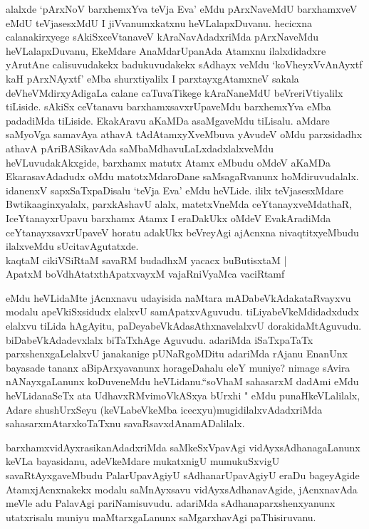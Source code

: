 \begin{artha}
alalxde `pArxNoV barxhemxYva teVja Eva' eMdu pArxNaveMdU barxhamxveV eMdU teVjasesxMdU I jiVvanumxkatxnu heVLalapxDuvanu. hecicxna calanakirxyege sAkiSxceVtanaveV kAraNavAdadxriMda pArxNaveMdu heVLalapxDuvanu, EkeMdare AnaMdarUpanAda Atamxnu ilalxdidadxre yArutAne calisuvudakekx badukuvudakekx sAdhayx veMdu `koVheyxVvAnAyxtf kaH pArxNAyxtf' eMba shurxtiyalilx I parxtayxgAtamxneV sakala deVheVMdirxyAdigaLa calane caTuvaTikege kAraNaneMdU beVreriVtiyalilx tiLiside. sAkiSx ceVtanavu barxhamxsavxrUpaveMdu barxhemxYva eMba padadiMda tiLiside. EkakAravu aKaMDa asaMgaveMdu tiLisalu. aMdare saMyoVga samavAya athavA tAdAtamxyXveMbuva yAvudeV oMdu parxsidadhx athavA pAriBASikavAda saMbaMdhavuLaLxdadxlalxveMdu heVLuvudakAkxgide, barxhamx matutx Atamx eMbudu oMdeV aKaMDa EkarasavAdadudx oMdu matotxMdaroDane saMsagaRvanunx hoMdiruvudalalx. idanenxV sapxSaTxpaDisalu `teVja Eva' eMdu heVLide. ililx teVjasesxMdare Bwtikaaginxyalalx, parxkAshavU alalx, matetxVneMda ceYtanayxveMdathaR, IceYtanayxrUpavu barxhamx Atamx I eraDakUkx oMdeV EvakAradiMda ceYtanayxsavxrUpaveV horatu adakUkx beVreyAgi ajAcnxna nivaqtitxyeMbudu ilalxveMdu sUcitavAgutatxde.\\
kaqtaM cikiVSiRtaM savaRM budadhxM yacacx buButisxtaM |\\
ApatxM boVdhAtatxthA\s \s patxvayxM vajaRniVyaMca vaciRtamf 
\end{artha}

\begin{artha}
eMdu heVLidaMte jAcnxnavu udayisida naMtara mADabeVkAdakataRvayxvu modalu apeVkiSxsidudx elalxvU samApatxvAguvudu. tiLiyabeVkeMdidadxdudx elalxvu tiLida hAgAyitu, paDeyabeVkAdasAthxnavelalxvU dorakidaMtAguvudu. biDabeVkAdadevxlalx biTaTxhAge Aguvudu. adariMda iSaTxpaTaTx parxshenxgaLelalxvU janakanige pUNaRgoMDitu adariMda rAjanu EnanUnx bayasade tananx aBipArxyavanunx horageDahalu eleY muniye? nimage sAvira nANayxgaLanunx koDuveneMdu heVLidanu.``soV\s haM sahasarxM dadAmi eMdu heVLidanaSeTx ata UdhavxRMvimoVkASxya bUrxhi " eMdu punaHkeVLalilalx, Adare shushUrxSeyu (keVLabeVkeMba icecxyu)mugidilalxvAdadxriMda sahasarxmAtarxkoTaTxnu savaRsavxdAnamADalilalx.
\end{artha}

\begin{artha}
barxhamxvidAyxrasikanAdadxriMda saMkeSxVpavAgi vidAyxsAdhanagaLanunx keVLa bayasidanu, adeVkeMdare mukatxnigU mumukuSxvigU savaRtAyxgaveMbudu PalarUpavAgiyU sAdhanarUpavAgiyU eraDu bageyAgide AtamxjAcnxnakekx modalu saMnAyxsavu vidAyxsAdhanavAgide, jAcnxnavAda meVle adu PalavAgi pariNamisuvudu. adariMda sAdhanaparxshenxyanunx utatxrisalu muniyu maMtarxgaLanunx saMgarxhavAgi paThisiruvanu.
\end{artha}
